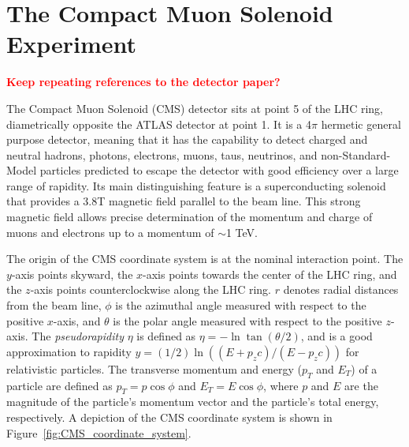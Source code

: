 \documentclass[dissertation.tex]{subfiles}
\begin{document}
\chapter{The Compact Muon Solenoid Experiment}
\label{chap:The Compact Muon Solenoid Experiment}

\textcolor{red}{\textbf{Keep repeating references to the detector paper?}}

The Compact Muon Solenoid (CMS) detector sits at point 5 of the LHC ring, diametrically opposite the ATLAS detector at point 1.  It is a 4$\pi$ hermetic general purpose detector, meaning that it has the capability to detect charged and neutral hadrons, photons, electrons, muons, taus, neutrinos, and non-Standard-Model particles predicted to escape the detector with good efficiency over a large range of rapidity.  Its main distinguishing feature is a superconducting solenoid that provides a 3.8T magnetic field parallel to the beam line.  This strong magnetic field allows precise determination of the momentum and charge of muons and electrons up to a momentum of $\sim$1 TeV.

The origin of the CMS coordinate system is at the nominal interaction point.  The $y$-axis points skyward, the $x$-axis points towards the center of the LHC ring, and the $z$-axis points counterclockwise along the LHC ring.  $r$ denotes radial distances from the beam line, $\phi$ is the azimuthal angle measured with respect to the positive $x$-axis, and $\theta$ is the polar angle measured with respect to the positive $z$-axis.  The \textit{pseudorapidity} $\eta$ is defined as $\eta = -\ln\tan(\theta/2)$, and is a good approximation to rapidity $y = (1/2)\ln((E + p_{z}c)/(E - p_{z}c))$ for relativistic particles.  The transverse momentum and energy ($p_{T}$ and $E_{T}$) of a particle are defined as $p_{T} = p\cos\phi$ and $E_{T} = E\cos\phi$, where $p$ and $E$ are the magnitude of the particle's momentum vector and the particle's total energy, respectively.  A depiction of the CMS coordinate system is shown in Figure~\ref{fig:CMS_coordinate_system}.
\end{document}
